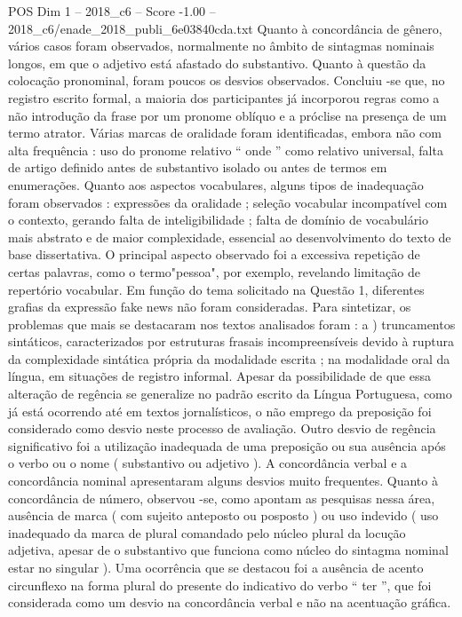 \begin{textsample}{POS Dim 1 – 2018\_c6 – Score -1.00 – 2018\_c6/enade\_2018\_publi\_6e03840cda.txt}
Quanto à concordância de gênero, vários casos foram observados, normalmente no âmbito de sintagmas nominais longos, em que o adjetivo está afastado do substantivo.
Quanto à questão da colocação pronominal, foram poucos os desvios observados.
Concluiu -se que, no registro escrito formal, a maioria dos participantes já incorporou regras como a não introdução da frase por um pronome oblíquo e a próclise na presença de um termo atrator.
Várias marcas de oralidade foram identificadas, embora não com alta frequência : uso do pronome relativo “ onde ” como relativo universal, falta de artigo definido antes de substantivo isolado ou antes de termos em enumerações.
Quanto aos aspectos vocabulares, alguns tipos de inadequação foram observados : expressões da oralidade ; seleção vocabular incompatível com o contexto, gerando falta de inteligibilidade ; falta de domínio de vocabulário mais abstrato e de maior complexidade, essencial ao desenvolvimento do texto de base dissertativa.
O principal aspecto observado foi a excessiva repetição de certas palavras, como o termo"pessoa", por exemplo, revelando limitação de repertório vocabular.
Em função do tema solicitado na Questão 1, diferentes grafias da expressão fake news não foram consideradas.
Para sintetizar, os problemas que mais se destacaram nos textos analisados foram : a ) truncamentos sintáticos, caracterizados por estruturas frasais incompreensíveis devido à ruptura da complexidade sintática própria da modalidade escrita ; na modalidade oral da língua, em situações de registro informal.
Apesar da possibilidade de que essa alteração de regência se generalize no padrão escrito da Língua Portuguesa, como já está ocorrendo até em textos jornalísticos, o não emprego da preposição foi considerado como desvio neste processo de avaliação.
Outro desvio de regência significativo foi a utilização inadequada de uma preposição ou sua ausência após o verbo ou o nome ( substantivo ou adjetivo ).
A concordância verbal e a concordância nominal apresentaram alguns desvios muito frequentes.
Quanto à concordância de número, observou -se, como apontam as pesquisas nessa área, ausência de marca ( com sujeito anteposto ou posposto ) ou uso indevido ( uso inadequado da marca de plural comandado pelo núcleo plural da locução adjetiva, apesar de o substantivo que funciona como núcleo do sintagma nominal estar no singular ).
Uma ocorrência que se destacou foi a ausência de acento circunflexo na forma plural do presente do indicativo do verbo “ ter ”, que foi considerada como um desvio na concordância verbal e não na acentuação gráfica.

\end{textsample}
